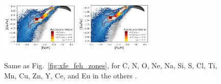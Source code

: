\documentclass[fleqn,usenatbib]{mnras}
\begin{document}
\begin{figure}
    \includegraphics[width=0.33\textwidth]{figures/xfe_feh_zones_Ce.png}
    \includegraphics[width=0.33\textwidth]{figures/xfe_feh_zones_Eu.png}
    \caption{Same as Fig.~\ref{fig:xfe_feh_zones}, for C, N, O, Ne, Na, Si, S, Cl, Ti, Mn, Cu, Zn, Y, Ce, and Eu in the others \href{https://github.com/svenbuder/gse_nihaouhd/tree/main/figures}{\faGithub}.}
    \label{fig:additional_xfe_feh_zones}
\end{figure}

\bsp
\label{lastpage}
\end{document}
